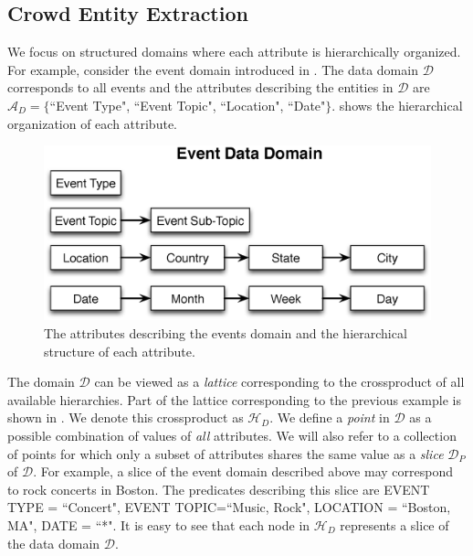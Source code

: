 \documentclass{vldb}
\newcommand{\domain}{\mathcal{D}}
\newcommand{\attributes}{\mathcal{A}_D}
\newcommand{\hierarchy}{\mathcal{H}_D}
\begin{document}
\subsection{Crowd Entity Extraction}
\label{sec:extraction}
We focus on structured domains where each attribute is hierarchically organized. For example, consider the event domain introduced in . The data domain $\domain$ corresponds to all events and the attributes describing the entities in $\domain$ are $\attributes = \{$``Event Type", ``Event Topic", ``Location", ``Date"$\}$.  shows the hierarchical organization of each attribute.

\begin{figure}[h]
	\begin{center}
	\includegraphics[clip,scale=0.4]{figs/eventsDomain.eps}
	\caption{The attributes describing the events domain and the hierarchical structure of each attribute.}
	\label{fig:eventsdomain}
	\end{center}
	\vspace{-10pt}
\end{figure}

The domain $\domain$ can be viewed as a {\em lattice} corresponding to the crossproduct of all available hierarchies. Part of the lattice corresponding to the previous example is shown in . We denote this crossproduct as $\hierarchy$. We define a {\em point} in $\domain$ as a possible combination of values of {\em all} attributes. We will also refer to a collection of points for which only a subset of attributes shares the same value as a {\em slice} $\domain_P$ of $\domain$. For example, a slice of the event domain described above may correspond to rock concerts in Boston. The predicates describing this slice are EVENT TYPE = ``Concert", EVENT TOPIC=``Music, Rock", LOCATION = ``Boston, MA", DATE = ``*".  It is easy to see that each node in $\hierarchy$ represents a slice of the data domain $\domain$. 
\end{document}
